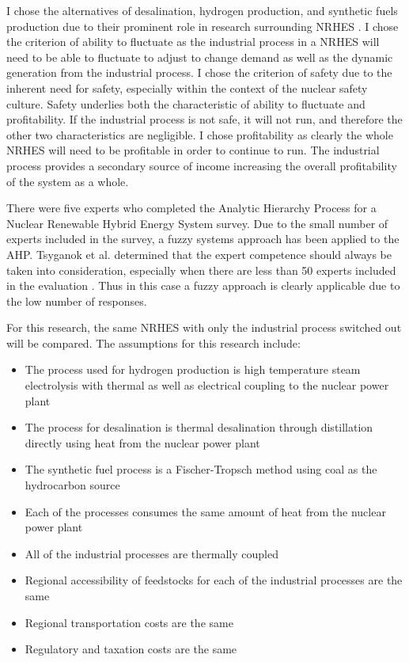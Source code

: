 \documentclass[12pt]{UIdahoMastersThesis}
\begin{document}
	I chose the alternatives of desalination, hydrogen production, and synthetic fuels production due to their prominent role in research surrounding NRHES \cite{Bragg-Sitton2014,Locatelli2015,Kim2016,Bragg-Sitton2016,Garcia2016,Shropshire2011, Ruth2014,Bienvenu2015}.  I chose the criterion of ability to fluctuate as the industrial process in a NRHES will need to be able to fluctuate to adjust to change demand as well as the dynamic generation from the industrial process.  I chose the criterion of safety due to the inherent need for safety, especially within the context of the nuclear safety culture.  Safety underlies both the characteristic of ability to fluctuate and profitability. If the industrial process is not safe, it will not run, and therefore the other two characteristics are negligible. I chose profitability as clearly the whole NRHES will need to be profitable in order to continue to run.  The industrial process provides a secondary source of income  increasing the overall profitability of the system as a whole.

There were five experts who completed the Analytic Hierarchy Process for a Nuclear Renewable Hybrid Energy System survey. Due to the small number of experts included in the survey, a fuzzy systems approach has been applied to the AHP. Tsyganok et al. determined that the expert competence should always be taken into consideration, especially when there are less than 50 experts included in the evaluation \cite{Tsyganok2012}. Thus in this case a fuzzy approach is clearly applicable due to the low number of responses.

 For this research, the same NRHES with only the industrial process switched out will be compared. The assumptions for this research include:
\begin{itemize}
\item The process used for hydrogen production is high temperature steam electrolysis with thermal as well as electrical coupling to the nuclear power plant
\item  The process for desalination is thermal desalination through distillation directly using heat from the nuclear power plant
\item The synthetic fuel process is a Fischer-Tropsch method using coal as the hydrocarbon source
\item Each of the processes consumes the same amount of heat from the nuclear power plant
\item All of the industrial processes are thermally coupled
\item Regional accessibility of feedstocks for each of the industrial processes are the same
\item Regional transportation costs are the same
\item Regulatory and taxation costs are the same
\end{itemize}
\end{document}
